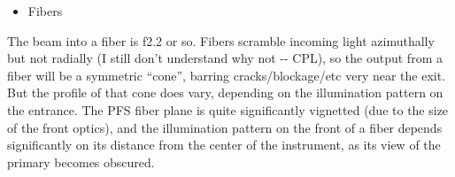 \documentclass[a4paper]{article}
\begin{document}
%
\begin{itemize}

\item Fibers

\end{itemize}

The beam into a fiber is f2.2 or so. Fibers scramble incoming light
azimuthally but not radially (I still don't understand why not -{}-
CPL), so the output from a fiber will be a symmetric ``cone'', barring
cracks/blockage/etc very near the exit. But the profile of that cone
does vary, depending on the illumination pattern on the entrance. The
PFS fiber plane is quite significantly vignetted (due to the size of
the front optics), and the illumination pattern on the front of a
fiber depends significantly on its distance from the center of the
instrument, as its view of the primary becomes obscured.
\end{document}
